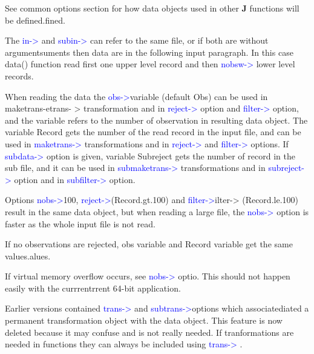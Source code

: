 \begin{note}
See common options section for how data objects used in other \textbf{J} functions will be defined.fined.
\end{note}
\begin{note}
The \textcolor{blue}{in->} and \textcolor{blue}{subin->} can refer to the same file, or if both are without argumentsuments
 then data are in the following input paragraph. In this case \textcolor{VioletRed}{data}() function read first one
 upper level record and then \textcolor{blue}{nobsw->} lower level records.
\end{note}
\begin{note}
When reading the data the \textcolor{blue}{obs->}variable (default Obs) can be used in maketrans-etrans-
 > transformation and in \textcolor{blue}{reject->} option and \textcolor{blue}{filter->} option, and the variable refers to
 the number of observation in resulting data object. The variable Record gets the number of
 the read record in the input file, and can be used in \textcolor{blue}{maketrans->} transformations and in
 \textcolor{blue}{reject->} and \textcolor{blue}{filter->} options. If \textcolor{blue}{subdata->} option is given, variable Subreject gets
 the number of record in the sub file, and it can be used in \textcolor{blue}{submaketrans->} transformations
 and in \textcolor{blue}{subreject->} option and in \textcolor{blue}{subfilter->} option.
\end{note}
\begin{note}
Options \textcolor{blue}{nobs->}100, \textcolor{blue}{reject->}(Record.gt.100) and \textcolor{blue}{filter->}ilter->
 (Record.le.100) result in the same data object, but when reading a large file, the \textcolor{blue}{nobs->}
 option is faster as the whole input file is not read.
\end{note}
\begin{note}
If no observations are rejected, obs variable and Record variable get the same values.alues.
\end{note}
\begin{note}
If virtual memory overflow occurs, see \textcolor{blue}{nobs->} optio. This should not happen easily with the currrentrrent
 64-bit application.
\end{note}
\begin{note}
Earlier versions contained \textcolor{blue}{trans->} and \textcolor{blue}{subtrans->}options which associatediated
 a permanent transformation object with the data object. This feature is now deleted because
 it may confuse and is not really needed. If tranformations are needed in functions
 they can always be included using \textcolor{blue}{trans->} .
\end{note}
